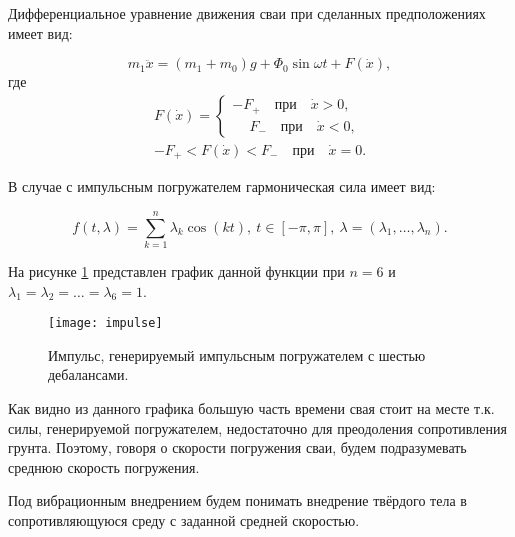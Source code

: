 Дифференциальное уравнение движения сваи при сделанных предположениях имеет вид:

\begin{equation}
    m_1\ddot{x} = (m_1 + m_0)g + \Phi_0 \sin \omega t + F(\dot{x}),
\end{equation}
где
\begin{equation}
    \begin{aligned}
        F(\dot{x}) =
        \begin{cases}
            -F_+ \quad \text{при} \quad \dot{x} > 0,\\
            \phantom{-}F_- \quad \text{при} \quad \dot{x} < 0,
        \end{cases}\\
        -F_+ < F(\dot{x}) < F_- \quad \text{при} \quad \dot{x} = 0.
    \end{aligned}
\end{equation}

\noindent В случае с импульсным погружателем гармоническая сила имеет вид:

\begin{equation}
    f(t,\lambda)=\sum_{k=1}^n \lambda_k\cos(kt),\ t\in [-\pi,\pi],\ \lambda =(\lambda_1, \ldots,\lambda_n).
\end{equation}

\noindent На рисунке \ref{fig:impulse} представлен график данной функции при $n = 6$ и
$\lambda_1 = \lambda_2 = \ldots = \lambda_6 = 1$.

\begin{figure}[h]
    \centering
    \texttt{[image: impulse]}
    \caption{Импульс, генерируемый импульсным погружателем с шестью дебалансами.}
    \label{fig:impulse}
\end{figure}

\noindent Как видно из данного графика большую часть времени свая стоит на месте т.к. силы, генерируемой погружателем,
недостаточно для преодоления сопротивления грунта. Поэтому, говоря о скорости погружения сваи, будем подразумевать среднюю
скорость погружения.


\begin{definition}
    Под вибрационным внедрением будем понимать внедрение твёрдого тела в сопротивляющуюся среду с заданной
    средней скоростью.
\end{definition}

